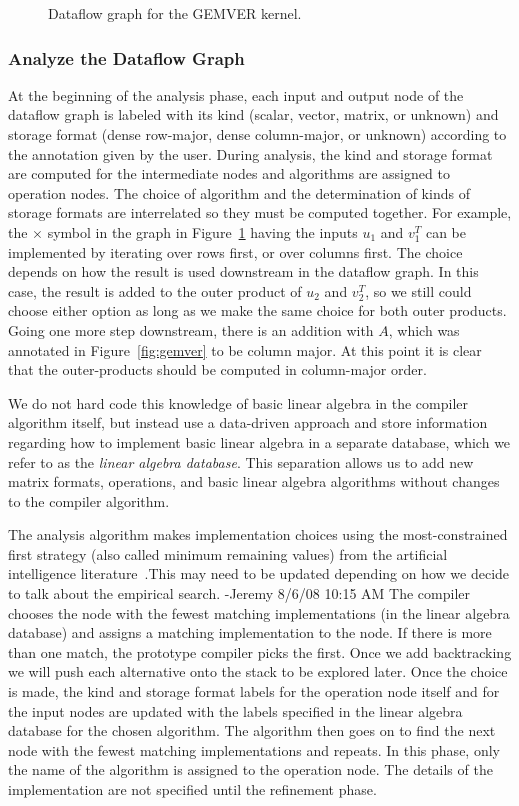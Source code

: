 \documentclass[11pt]{article}
\begin{document}
\begin{figure}[htbp]
  \centering
 
\caption{Dataflow graph for the GEMVER kernel.}
  \label{fig:gemver-dataflow}
\end{figure}

\subsubsection{Analyze the Dataflow Graph}

At the beginning of the analysis phase, each input and output node of the dataflow graph is labeled with its kind (scalar, vector, matrix, or unknown) and storage format (dense row-major, dense column-major, or unknown) according to the annotation given by the user.  During analysis, the kind and storage format are computed for the intermediate nodes and algorithms are assigned to operation nodes. The choice of algorithm and the determination of kinds of storage formats are interrelated so they must be computed together.  For example, the $\times$ symbol in the graph in Figure~\ref{fig:gemver-dataflow} having the inputs $u_1$ and $v_1^T$ can be implemented by iterating over rows first, or over columns first. The choice depends on how the result is used downstream in the dataflow graph.  In this case, the result is added to the outer product of $u_2$ and $v_2^T$, so we still could choose either option as long as we make the same choice for both outer products. Going one more step downstream, there is an addition with $A$, which was annotated in Figure~\ref{fig:gemver} to be column major. At this point it is clear that the outer-products should be computed in column-major order.

We do not hard code this knowledge of basic linear algebra in the compiler algorithm itself, but instead use a data-driven approach and store information regarding how to implement basic linear algebra in a separate database, which we refer to as the \emph{linear algebra database}.  This separation allows us to add new matrix formats, operations, and basic linear algebra algorithms without changes to the
compiler algorithm. 

The analysis algorithm makes implementation choices using the most-constrained first strategy (also called minimum remaining values)
from the artificial intelligence literature~\cite{Russell:2003mz}.This may need to be updated depending on how we decide to talk about the empirical search. -Jeremy 8/6/08 10:15 AM 
The compiler chooses the node with the fewest matching implementations (in the linear algebra database) and assigns a matching implementation to the node.  If there is more than one match, the prototype compiler picks the first.  Once we add backtracking we will push each alternative onto the stack to be explored later. Once the choice is made, the kind and storage format labels for the operation node itself and for the input nodes are updated with the labels specified in the linear algebra database for the chosen algorithm. The algorithm then goes on to find the next node with the fewest matching implementations and repeats.  In this phase, only the name of the algorithm is assigned to the operation node.  The details of the implementation are not specified until the refinement phase.
\end{document}
